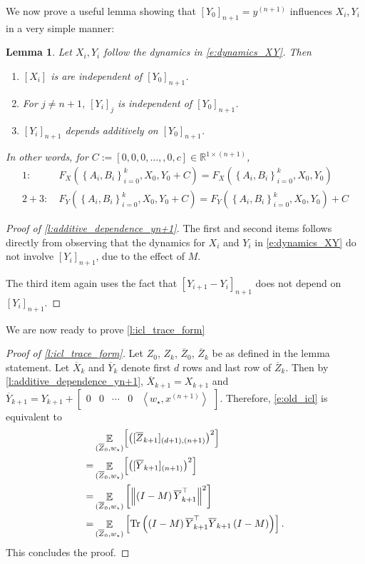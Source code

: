 \documentclass{article}
\DeclareMathOperator{\E}{\mathbb{E}}
\newcommand{\R}{\mathbb{R}}
\newtheorem{lemma}{Lemma}
\newcommand{\wstar}{w_\star}
\newcommand{\tx}[1]{x^{(#1)}}
\newcommand{\ty}[1]{y^{(#1)}}
\DeclareMathOperator{\tr}{Tr}
\newcommand*\lin[1]{\left\langle #1 \right\rangle}
\newcommand*\lrb[1]{\left[ #1 \right]}
\newcommand*\lrn[1]{\left\| #1 \right\|}
\newcommand*\lrp[1]{\left( #1 \right)}
\newcommand*\lrbb[1]{\left\{ #1 \right\}}
\begin{document}
We now prove a useful lemma showing that $\lrb{Y_0}_{n+1}=\ty{n+1}$ influences $X_i,Y_i$ in a very simple manner:
\begin{lemma}
\label{l:additive_dependence_yn+1}
Let $X_i,Y_i$ follow the dynamics in \eqref{e:dynamics_XY}. Then
\begin{enumerate}
\item $\lrb{X_i}$ is are independent of $\lrb{Y_0}_{n+1}$.
\item For $j\neq n+1$, $\lrb{Y_i}_{j}$ is independent of $\lrb{Y_0}_{n+1}$. 
\item $\lrb{Y_i}_{n+1}$ depends additively on $\lrb{Y_0}_{n+1}$.
\end{enumerate}

In other words, for $C := \lrb{0,0,0,\dots,,0,c} \in \R^{1\times (n+1)}$,
\begin{align*}
1:\ & F_{X}\lrp{\lrbb{A_i,B_i}_{i=0}^k, X_0,Y_0 + C} = F_{X}\lrp{\lrbb{A_i,B_i}_{i=0}^k, X_0,Y_0} \\
2 + 3:\ & F_{Y}\lrp{\lrbb{A_i,B_i}_{i=0}^k, X_0,Y_0 + C} = F_{Y}\lrp{\lrbb{A_i,B_i}_{i=0}^k, X_0,Y_0} + C
\end{align*}
\end{lemma}
\begin{proof}[Proof of \autoref{l:additive_dependence_yn+1}]
The first and second items follows directly from observing that the dynamics for $X_i$ and $Y_i$ in \eqref{e:dynamics_XY} do not involve $\lrb{Y_i}_{n+1}$, due to the effect of $M$.

The third item again uses the fact that $\lrb{Y_{i+1} - Y_i}_{n+1}$ does not depend on $\lrb{Y_{i}}_{n+1}$.
\end{proof}

We are now ready to prove \autoref{l:icl_trace_form}

\begin{proof}[Proof of \autoref{l:icl_trace_form}]
Let $Z_0$, $Z_k$, $\overline{Z}_0$, $\overline{Z}_k$ be as defined in the lemma statement. Let $\overline{X}_k$ and $\overline{Y}_k$ denote first $d$ rows and last row of $\overline{Z}_k$. Then by \autoref{l:additive_dependence_yn+1}, $\overline{X}_{k+1} = X_{k+1}$ and $\overline{Y}_{k+1} = Y_{k+1} + \begin{bmatrix}0 & 0 & \cdots & 0 & \lin{\wstar, \tx{n+1}}\end{bmatrix}$. Therefore, \eqref{e:old_icl} is equivalent to
\begin{align*}
& \E_{(\overline{Z}_0,\wstar)} \Bigl[ \left( [\overline{Z}_{k+1}]_{(d+1),(n+1)}  \right)^2\Bigr]\\
=& \E_{(\overline{Z}_0,\wstar)} \Bigl[ \left( [\overline{Y}_{k+1}]_{(n+1)}  \right)^2\Bigr]\\
=& \E_{(\overline{Z}_0,\wstar)} \lrb{\lrn{\lrp{I-M}\overline{Y}_{k+1}^\top}^2}\\
=& \E_{(\overline{Z}_0,\wstar)} \lrb{\tr\lrp{\lrp{I-M}\overline{Y}_{k+1}^\top \overline{Y}_{k+1}\lrp{I-M}}}.
\end{align*}
This concludes the proof. 
\end{proof}
\end{document}
